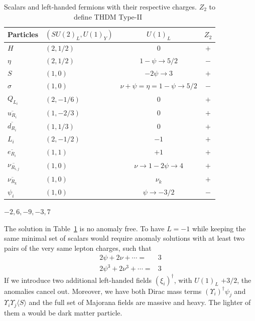 \documentclass[12pt]{article}
\begin{document}
%
\begin{table}
  \centering
  \begin{tabular}{|l|l|c|c|}
    \hline  
    Particles     & $\left( SU(2)_L, U(1)_Y \right)$ & $U(1)_{L}$& $Z_2$\\ \hline
    $H $  & $(2, 1/2)$ &  0 &$+$\\
    $\eta$ & $(2,1/2)$ & $1-\psi\to 5/2$ &$-$\\
    $S$ & $(1,0)$ & $-2\psi\to 3$ &$+$\\
    $\sigma$ & $(1,0)$ & $\nu+\psi=\eta=1-\psi\to 5/2$&$-$\\
    \hline
    $Q_{L_{i}}$  & $(2,-1/6)$ & $0$& $+$\\
    $\overline{u_{R_{i}}}$ & $(1,-2/3)$ & $0$& $+$\\
    $\overline{d_{R_{i}}}$ & $(1,1/3)$ & $0$& $+$\\
    \hline
    $L_i$  & $(2,-1/2)$ & $-1$& $+$\\
    $\overline{e_{R_i}}$ & $(1,1)$ & $+1$ & $+$ \\
    $\overline{\nu_{R_{i,j}}}$ & $(1,0)$ & $\nu\to 1-2\psi\to 4$&$+$\\
    $\overline{\nu_{R_k}}$ & $(1,0)$ & $\nu_k$&$+$\\
    $\psi_{i}$  & $(1,0)$ & $\psi\to -3/2$ &$-$\\\hline
  \end{tabular}
  \caption{Scalars and left-handed fermions with their respective charges. $Z_2$ to define THDM Type-II~\cite{Chiang:2013ixa}}
  \label{tab:partcont}
\end{table}
%

$-2,6,-9,-3,7$

The solution in Table~\ref{tab:partcont} is no anomaly free. To have $L=-1$ while keeping the same minimal set of scalars would require anomaly solutions with at least two pairs of the very same lepton charges, such that
\begin{align}
    2\psi+2\nu+\cdots=&3 \nonumber\\
    2\psi^3+2\nu^3+\cdots=&3
\end{align}
If we introduce two additional left-handed fields $(\xi_i)^\dagger$,  with $U(1)_L$ $+3/2$, the anomalies cancel out. Moreover, we have both Dirac mass terms $(\Upsilon_i)^\dagger\psi_j$ and $ \Upsilon_i \Upsilon_j \langle S\rangle$ and the full set of Majorana fields are massive and heavy. The lighter of them a would be dark matter particle.
\end{document}
